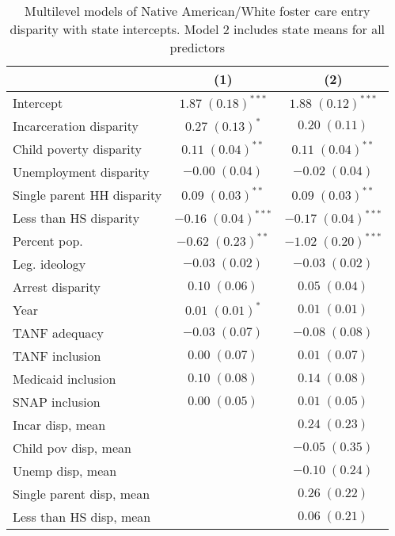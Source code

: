 
\begin{table}
\caption{Multilevel models of Native American/White foster care entry disparity with state intercepts. Model 2 includes state means for all predictors }
\begin{center}
\begin{tabular}{l c c }
\hline
 & (1) & (2) \\
\hline
Intercept                  & $1.87 \; (0.18)^{***}$  & $1.88 \; (0.12)^{***}$  \\
Incarceration disparity    & $0.27 \; (0.13)^{*}$    & $0.20 \; (0.11)$        \\
Child poverty disparity    & $0.11 \; (0.04)^{**}$   & $0.11 \; (0.04)^{**}$   \\
Unemployment disparity     & $-0.00 \; (0.04)$       & $-0.02 \; (0.04)$       \\
Single parent HH disparity & $0.09 \; (0.03)^{**}$   & $0.09 \; (0.03)^{**}$   \\
Less than HS disparity     & $-0.16 \; (0.04)^{***}$ & $-0.17 \; (0.04)^{***}$ \\
Percent pop.               & $-0.62 \; (0.23)^{**}$  & $-1.02 \; (0.20)^{***}$ \\
Leg. ideology              & $-0.03 \; (0.02)$       & $-0.03 \; (0.02)$       \\
Arrest disparity           & $0.10 \; (0.06)$        & $0.05 \; (0.04)$        \\
Year                       & $0.01 \; (0.01)^{*}$    & $0.01 \; (0.01)$        \\
TANF adequacy              & $-0.03 \; (0.07)$       & $-0.08 \; (0.08)$       \\
TANF inclusion             & $0.00 \; (0.07)$        & $0.01 \; (0.07)$        \\
Medicaid inclusion         & $0.10 \; (0.08)$        & $0.14 \; (0.08)$        \\
SNAP inclusion             & $0.00 \; (0.05)$        & $0.01 \; (0.05)$        \\
Incar disp, mean           &                         & $0.24 \; (0.23)$        \\
Child pov disp, mean       &                         & $-0.05 \; (0.35)$       \\
Unemp disp, mean           &                         & $-0.10 \; (0.24)$       \\
Single parent disp, mean   &                         & $0.26 \; (0.22)$        \\
Less than HS disp, mean    &                         & $0.06 \; (0.21)$        \\

\end{tabular}
\end{center}
\end{table}
